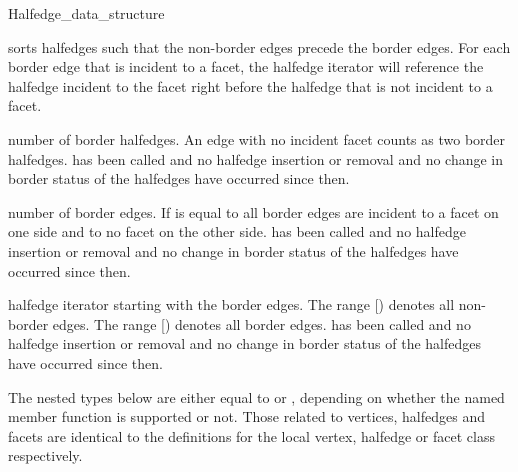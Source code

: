 \begin{ccClass}{Halfedge_data_structure}
\begin{ccAdvanced}

    {sorts halfedges such that the non-border edges precede the
     border edges. For each border edge that is incident to a facet,
     the halfedge iterator will reference the halfedge incident to the
     facet right before the halfedge that is not incident to a facet.}

    {number of border halfedges. An edge with no incident facet
      counts as two border halfedges.
    \ccPrecond {} has been called and no
    halfedge insertion or removal and no change in border
    status of the halfedges have occurred since then.}

    {number of border edges. If  is equal
    to  all border edges are incident to
    a facet on one side and to no facet on the other side.
    \ccPrecond {} has been called and no
    halfedge insertion or removal and no change in border
    status of the halfedges have occurred since then.}

    {halfedge iterator starting with the border edges. The range
      [) denotes
    all non-border edges. The range
    [) denotes all
    border edges.
    \ccPrecond {} has been called and no
    halfedge insertion or removal and no change in border
    status of the halfedges have occurred since then.}

\end{ccAdvanced}


\begin{ccAdvanced}

The nested types below are either equal to  or
, depending on whether the named member function is
supported or not. Those related to vertices, halfedges and facets are
identical to the definitions for the local vertex, halfedge or facet
class respectively.

\ccGlue
{}
\ccGlue
{}
\ccGlue
{}
\ccGlue
{}
\ccGlue
{}


\end{ccAdvanced}
\end{ccClass}
